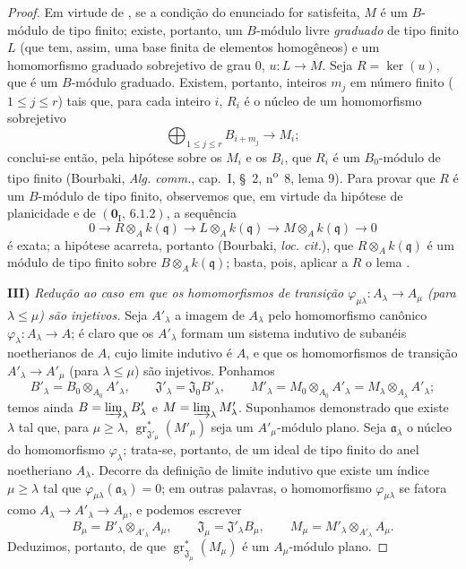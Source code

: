 \begin{proof}
Em virtude de , se a condição do enunciado for satisfeita, $M$ é um $B$-módulo de tipo finito; existe, portanto, um $B$-módulo livre \emph{graduado} de tipo finito $L$ (que tem, assim, uma base finita de elementos homogêneos) e um homomorfismo graduado sobrejetivo de grau $0$, $u:L\to M$. Seja $R=\ker(u)$, que é um $B$-módulo graduado. Existem, portanto, inteiros $m_j$ em número finito ($1\leq j\leq r$) tais que, para cada inteiro $i$, $R_i$ é o núcleo de um homomorfismo sobrejetivo
\[
\bigoplus_{1\leq j\leq r}B_{i+m_j}\longrightarrow M_i;
\]
conclui-se então, pela hipótese sobre os $M_i$ e os $B_i$, que $R_i$ é um $B_0$-módulo de tipo finito (Bourbaki, \emph{Alg. comm.}, cap.~I, \S~2, n\textsuperscript{o}~8, lema 9). Para provar que $R$ é um $B$-módulo de tipo finito, observemos que, em virtude da hipótese de planicidade e de $(\mathbf 0_{\mathrm I},\,6.1.2)$, a sequência
\[
0\longrightarrow R\otimes_Ak(\mathfrak q)
\longrightarrow L\otimes_Ak(\mathfrak q)
\longrightarrow M\otimes_Ak(\mathfrak q)\longrightarrow0
\]
é exata; a hipótese acarreta, portanto (Bourbaki, \emph{loc. cit.}), que $R\otimes_Ak(\mathfrak q)$ é um módulo de tipo finito sobre $B\otimes_Ak(\mathfrak q)$; basta, pois, aplicar a $R$ o lema .

\medskip
\noindent\textbf{III)} \emph{Redução ao caso em que os homomorfismos de transição $\varphi_{\mu\lambda}:A_\lambda\to A_\mu$ (para $\lambda\leq\mu$) são injetivos.} Seja $A'_\lambda$ a imagem de $A_\lambda$ pelo homomorfismo canônico $\varphi_\lambda:A_\lambda\to A$; é claro que os $A'_\lambda$ formam um sistema indutivo de subanéis noetherianos de $A$, cujo limite indutivo é $A$, e que os homomorfismos de transição $A'_\lambda\to A'_\mu$ (para $\lambda\leq\mu$) são injetivos. Ponhamos
\[
B'_\lambda=B_0\otimes_{A_0}A'_\lambda,\qquad
\mathfrak J'_\lambda=\mathfrak J_0B'_\lambda,\qquad
M'_\lambda=M_0\otimes_{A_0}A'_\lambda
=M_\lambda\otimes_{A_\lambda}A'_\lambda;
\]
temos ainda $B=\varinjlim_\lambda B'_\lambda$ e $M=\varinjlim_\lambda M'_\lambda$. Suponhamos demonstrado que existe $\lambda$ tal que, para $\mu\geq\lambda$, $\operatorname{gr}_{\mathfrak J'_\mu}^*(M'_\mu)$ seja um $A'_\mu$-módulo plano. Seja $\mathfrak a_\lambda$ o núcleo do homomorfismo $\varphi_\lambda$; trata-se, portanto, de um ideal de tipo finito do anel noetheriano $A_\lambda$. Decorre da definição de limite indutivo que existe um índice $\mu\geq\lambda$ tal que $\varphi_{\mu\lambda}(\mathfrak a_\lambda)=0$; em outras palavras, o homomorfismo $\varphi_{\mu\lambda}$ se fatora como $A_\lambda\to A'_\lambda\to A_\mu$, e podemos escrever
\[
B_\mu=B'_\lambda\otimes_{A'_\lambda}A_\mu,\qquad
\mathfrak J_\mu=\mathfrak J'_\lambda B_\mu,\qquad
M_\mu=M'_\lambda\otimes_{A'_\lambda}A_\mu.
\]
Deduzimos, portanto, de  que $\operatorname{gr}_{\mathfrak J_\mu}^*(M_\mu)$ é um $A_\mu$-módulo plano.


\end{proof}
